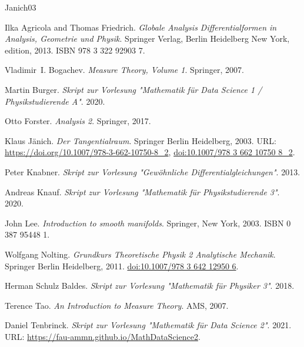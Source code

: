 \documentclass[letterpaper,10pt,german]{jupyterBook}
\begin{document}
\begin{sphinxthebibliography}{Janich03}
\par
Ilka Agricola and Thomas Friedrich. \emph{Globale Analysis   Differentialformen in Analysis, Geometrie und Physik}. Springer Verlag, Berlin Heidelberg New York, edition, 2013. ISBN 978 3 322 92903 7.
\par
Vladimir I. Bogachev. \emph{Measure Theory, Volume 1}. Springer, 2007.
\par
Martin Burger. \emph{Skript zur Vorlesung "Mathematik für Data Science 1 / Physikstudierende A"}. 2020.
\par
Otto Forster. \emph{Analysis 2}. Springer, 2017.
\par
Klaus Jänich. \emph{Der Tangentialraum}. Springer Berlin Heidelberg, 2003. URL: \url{https://doi.org/10.1007/978-3-662-10750-8\_2}, \href{https://doi.org/10.1007/978-3-662-10750-8\_2}{doi:10.1007/978 3 662 10750 8\_2}.
\par
Peter Knabner. \emph{Skript zur Vorlesung "Gewöhnliche Differentialgleichungen"}. 2013.
\par
Andreas Knauf. \emph{Skript zur Vorlesung "Mathematik für Physikstudierende 3"}. 2020.
\par
John Lee. \emph{Introduction to smooth manifolds}. Springer, New York, 2003. ISBN 0 387 95448 1.
\par
Wolfgang Nolting. \emph{Grundkurs Theoretische Physik 2   Analytische Mechanik}. Springer Berlin Heidelberg, 2011. \href{https://doi.org/10.1007/978-3-642-12950-6}{doi:10.1007/978 3 642 12950 6}.
\par
Herman Schulz Baldes. \emph{Skript zur Vorlesung "Mathematik für Physiker 3"}. 2018.
\par
Terence Tao. \emph{An Introduction to Measure Theory}. AMS, 2007.
\par
Daniel Tenbrinck. \emph{Skript zur Vorlesung "Mathematik für Data Science 2"}. 2021. URL: \url{https://fau-ammn.github.io/MathDataScience2}.
\end{sphinxthebibliography}






\renewcommand{\indexname}{Proof Index}


\renewcommand{\indexname}{Stichwortverzeichnis}
\end{document}
